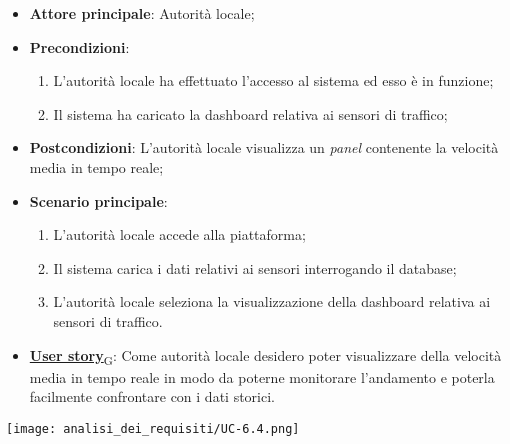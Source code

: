 \begin{itemize}
	\item \textbf{Attore principale}: Autorità locale;
	\item \textbf{Precondizioni}:
	      \begin{enumerate}
		      \item L'autorità locale ha effettuato l'accesso al sistema ed esso è in funzione;
		      \item Il sistema ha caricato la dashboard relativa ai sensori di traffico;
	      \end{enumerate}
	\item \textbf{Postcondizioni}: L'autorità locale visualizza un \textit{panel} contenente la velocità media in tempo reale;
	\item \textbf{Scenario principale}:
	      \begin{enumerate}
		      \item L'autorità locale accede alla piattaforma;
		      \item Il sistema carica i dati relativi ai sensori interrogando il database;
		      \item L'autorità locale seleziona la visualizzazione della dashboard relativa ai sensori di traffico.
	      \end{enumerate}
	\item \href{https://7last.github.io/docs/rtb/documentazione-interna/glossario\#user-story}{\textbf{User story}\textsubscript{G}}:
	      Come autorità locale desidero poter visualizzare della velocità media in tempo reale in modo da poterne monitorare l'andamento
	      e poterla facilmente confrontare con i dati storici.
\end{itemize}
\begin{center}
	\texttt{[image: analisi\_dei\_requisiti/UC-6.4.png]}
\end{center}

